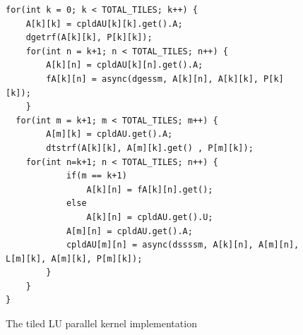 \begin{figure}[!ht]
\begin{lstlisting}
for(int k = 0; k < TOTAL_TILES; k++) {
	A[k][k] = cpldAU[k][k].get().A;
	dgetrf(A[k][k], P[k][k]);
	for(int n = k+1; n < TOTAL_TILES; n++) {
		A[k][n] = cpldAU[k][n].get().A;
		fA[k][n] = async(dgessm, A[k][n], A[k][k], P[k][k]);
	}
  for(int m = k+1; m < TOTAL_TILES; m++) {
		A[m][k] = cpldAU.get().A;
		dtstrf(A[k][k], A[m][k].get() , P[m][k]);
  	for(int n=k+1; n < TOTAL_TILES; n++) {
			if(m == k+1)
				A[k][n] = fA[k][n].get();
			else
				A[k][n] = cpldAU.get().U;
			A[m][n] = cpldAU.get().A;
			cpldAU[m][n] = async(dssssm, A[k][n], A[m][n], L[m][k], A[m][k], P[m][k]);
		}
	}
}

\end{lstlisting}
\caption{The tiled LU parallel kernel implementation}
\label{lst:tiledLUpar}
\end{figure}

